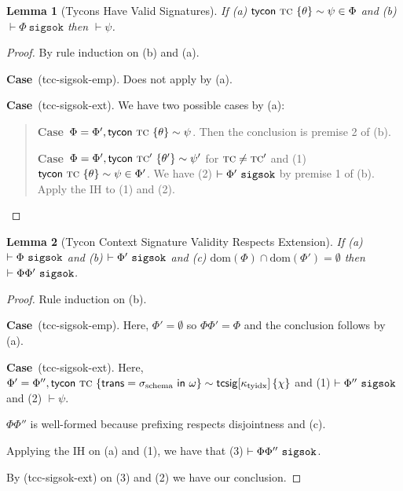 \documentclass[12pt]{article}
\newtheorem{lemma}{Lemma}
\newcommand{\pfcase}[1]{\textbf{Case}~#1. }
\begin{document}
\begin{lemma}[Tycons Have Valid Signatures]
\label{lemma:tycons-have-valid-signatures}
If (a) ${\sf tycon}~\textsc{tc} ~\{\theta\} \sim \psi \in \Phi$ and (b) $\vdash \Phi~\mathtt{sigsok}$ then $\vdash \psi$.
\end{lemma}
\begin{proof} By rule induction on (b) and (a).

\pfcase{(tcc-sigsok-emp)} Does not apply by (a).

\pfcase{(tcc-sigsok-ext)} We have two possible cases by (a):
\begin{quote}
\pfcase{$\Phi=\Phi', {\sf tycon}~\textsc{tc} ~\{\theta\} \sim \psi$} Then the conclusion is premise 2 of (b).

\pfcase{$\Phi=\Phi', {\sf tycon}~\textsc{tc}' ~\{\theta'\} \sim \psi'$ for $\textsc{tc}\neq\textsc{tc}'$ and (1) ${\sf tycon}~\textsc{tc} ~\{\theta\} \sim \psi \in \Phi'$} We have (2) $\vdash \Phi'~\mathtt{sigsok}$ by premise 1 of (b). Apply the IH to (1) and (2).
\end{quote}
\end{proof}

\begin{lemma}[Tycon Context Signature Validity Respects Extension]
If (a) $\vdash \Phi~\mathtt{sigsok}$ and (b) $\vdash \Phi'~\mathtt{sigsok}$ and (c) $\text{dom}(\Phi) \cap \text{dom}(\Phi') = \emptyset$ then $\vdash \Phi\Phi'~\mathtt{sigsok}$.
\end{lemma}
\begin{proof} Rule induction on (b).

\pfcase{(tcc-sigsok-emp)} Here, $\Phi'=\emptyset$ so $\Phi\Phi'=\Phi$ and the conclusion follows by (a).

\pfcase{(tcc-sigsok-ext)} Here, $\Phi'=\Phi'', {\sf tycon}~\textsc{tc} ~\{{\sf trans}=\sigma_\text{schema}~{\sf in}~\omega\} \sim {\sf tcsig}[\kappa_\text{tyidx}]\,\{\chi\}$ and (1) $\vdash \Phi''~\mathtt{sigsok}$ and (2) $\vdash \psi$. 

$\Phi\Phi''$ is well-formed because prefixing respects disjointness and (c).

Applying the IH on (a) and (1), we have that (3) $\vdash \Phi\Phi''~\mathtt{sigsok}$. 

By (tcc-sigsok-ext) on (3) and (2) we have our conclusion.
\end{proof}
\newpage


\end{document}
